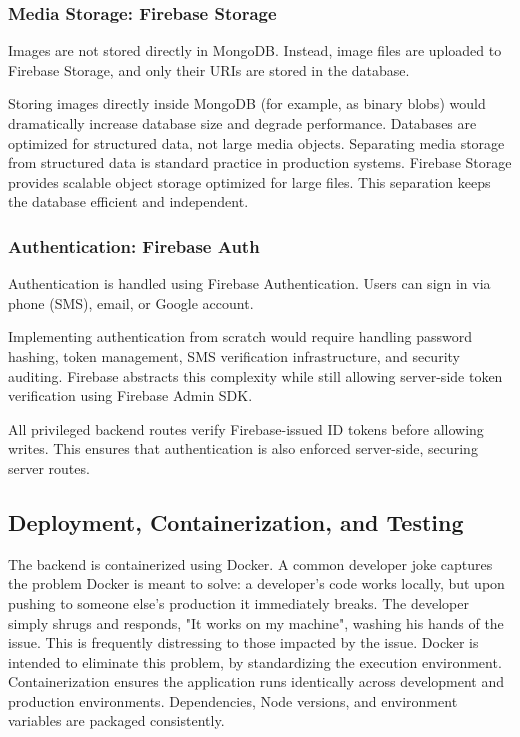 \documentclass[12pt]{article}
\begin{document}
\subsubsection{Media Storage: Firebase Storage}

Images are not stored directly in MongoDB. Instead, image files are uploaded to Firebase Storage, and only their URIs are stored in the database.

Storing images directly inside MongoDB (for example, as binary blobs) would dramatically increase database size and degrade performance. Databases are optimized for structured data, not large media objects. Separating media storage from structured data is standard practice in production systems. Firebase Storage provides scalable object storage optimized for large files. This separation keeps the database efficient and independent.

\subsubsection{Authentication: Firebase Auth}

Authentication is handled using Firebase Authentication. Users can sign in via phone (SMS), email, or Google account.

Implementing authentication from scratch would require handling password hashing, token management, SMS verification infrastructure, and security auditing. Firebase abstracts this complexity while still allowing server-side token verification using Firebase Admin SDK.

All privileged backend routes verify Firebase-issued ID tokens before allowing writes. This ensures that authentication is also enforced server-side, securing server routes.

\subsection{Deployment, Containerization, and Testing}

The backend is containerized using Docker.  A common developer joke captures the problem Docker is meant to solve: a developer's code works locally, but upon pushing to someone else's production it immediately breaks. The developer simply shrugs and responds, "It works on my machine", washing his hands of the issue. This is frequently distressing to those impacted by the issue. Docker is intended to eliminate this problem, by standardizing the execution environment. Containerization ensures the application runs identically across development and production environments. Dependencies, Node versions, and environment variables are packaged consistently.
\end{document}
